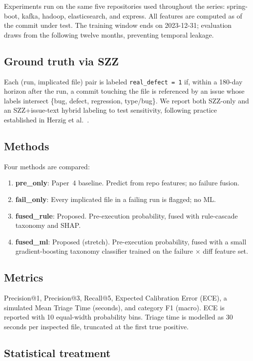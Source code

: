 \documentclass[conference]{IEEEtran}
\begin{document}
Experiments run on the same five repositories used throughout the series: spring-boot, kafka, hadoop, elasticsearch, and express. All features are computed as of the commit under test. The training window ends on 2023-12-31; evaluation draws from the following twelve months, preventing temporal leakage.

\subsection{Ground truth via SZZ}

Each (run, implicated file) pair is labeled \texttt{real\_defect = 1} if, within a 180-day horizon after the run, a commit touching the file is referenced by an issue whose labels intersect \{bug, defect, regression, type/bug\}. We report both SZZ-only and an SZZ+issue-text hybrid labeling to test sensitivity, following practice established in Herzig et al.~\cite{Herzig2015}.

\subsection{Methods}

Four methods are compared:
\begin{enumerate}
    \item \textbf{pre\_only}: Paper~4 baseline. Predict from repo features; no failure fusion.
    \item \textbf{fail\_only}: Every implicated file in a failing run is flagged; no ML.
    \item \textbf{fused\_rule}: Proposed. Pre-execution probability, fused with rule-cascade taxonomy and SHAP.
    \item \textbf{fused\_ml}: Proposed (stretch). Pre-execution probability, fused with a small gradient-boosting taxonomy classifier trained on the failure $\times$ diff feature set.
\end{enumerate}

\subsection{Metrics}

Precision@1, Precision@3, Recall@5, Expected Calibration Error (ECE), a simulated Mean Triage Time (seconds), and category F1 (macro). ECE is reported with 10 equal-width probability bins. Triage time is modelled as 30 seconds per inspected file, truncated at the first true positive.

\subsection{Statistical treatment}
\end{document}
